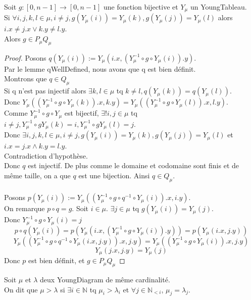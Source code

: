 \begin{lemma}[No2FromSameColToSameRow]
    \label{No2FromSameColToSameRow}
    Soit $g : [0,n-1] \to [0,n-1]$ une fonction bijective et $Y_{\mu}$ un YoungTableau.\\
    Si $\forall i, j, k, l \in \mu, i \neq j, g(Y_{\mu}(i)) = Y_{\mu}(k), g(Y_{\mu}(j)) = Y_{\mu}(l)$ alors $i.x \neq j.x \lor k.y \neq l.y$.\\
    Alors $g \in P_{\mu}Q_{\mu}$
\end{lemma}
\begin{proof}
    Posons $q(Y_{\mu}(i)) := Y_{\mu}(i.x,(Y_{\mu}^{-1} \circ g \circ Y_{\mu}(i)).y)$.\\
    Par le lemme qWellDefined, nous avons que q est bien définit.\\
    Montrons que $q \in Q_{\mu}$\\
    Si q n'est pas injectif alors $\exists k, l \in \mu$ tq $k \neq l, q(Y_{\mu}(k))=q(Y_{\mu}(l))$.\\
    Donc $Y_{\mu}((Y_{\mu}^{-1} \circ g \circ Y_{\mu}(k)).x,k.y) = Y_{\mu}((Y_{\mu}^{-1} \circ g \circ Y_{\mu}(l)).x,l.y)$.\\
    Comme $Y_{\mu}^{-1} \circ g \circ Y_{\mu}$ est bijectif, $\exists! i,j \in \mu$ tq $i \neq j, Y_{\mu}^{-1} \circ g Y_{\mu}(k)=i, Y_{\mu}^{-1} \circ g Y_{\mu}(l)=j$.\\
    Donc $\exists i, j, k, l \in \mu, i \neq j, g(Y_{\mu}(i)) = Y_{\mu}(k), g(Y_{\mu}(j)) = Y_{\mu}(l)$ et $i.x = j.x \land k.y = l.y$.\\
    Contradiction d'hypothèse.\\
    Donc $q$ est injectif. De plus comme le domaine et codomaine sont finis et de même taille, on a que $q$ est une bijection. Ainsi $q \in Q_{\mu}$.\\
    \\
    Posons $p(Y_{\mu}(i)) := Y_{\mu}((Y_{\mu}^{-1} \circ g \circ q^{-1} \circ Y_{\mu}(i)).x,i.y)$.\\
    On remarque $p \circ q = g$. Soit $i \in \mu$. $\exists j \in \mu$ tq $g(Y_{\mu}(i))=Y_{\mu}(j)$.\\
    Donc $Y_{\mu}^{-1} \circ g \circ Y_{\mu}(i) = j$
    \[ p \circ q(Y_{\mu}(i)) = p (Y_{\mu}(i.x,(Y_{\mu}^{-1} \circ g \circ Y_{\mu}(i)).y)) = p (Y_{\mu}(i.x,j.y)) \]
    \[Y_{\mu}((Y_{\mu}^{-1} \circ g \circ q^{-1} \circ Y_{\mu}(i.x,j.y)).x,j.y) = Y_{\mu}((Y_{\mu}^{-1} \circ g \circ Y_{\mu}(i)).x,j.y)\]
    \[ Y_{\mu}(j.x,j.y) = Y_{\mu}(j)\]
    Donc $p$ est bien définit, et $g \in P_{\mu} Q_{\mu}$
\end{proof}

\begin{definition}[IneqYoungDiagram]
    \label{IneqYoungDiagram}
    \leanok
    Soit $\mu$ et $\lambda$ deux YoungDiagram de même cardinalité.\\
    On dit que $\mu > \lambda$ si $\exists i \in \mathbb{N}$ tq $\mu_{i}>\lambda_{i}$ et $\forall j \in \mathbb{N}_{<i}$, $\mu_{j} = \lambda_{j}$.
\end{definition}